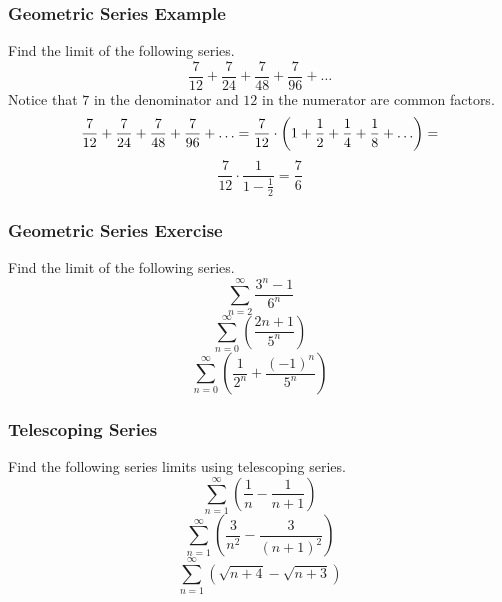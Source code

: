 \documentclass[xcolor=dvipsnames]{beamer}
\begin{document}
\begin{frame}
  \frametitle{Geometric Series Example}
 Find the limit of the following
series.
\begin{equation}
  \label{eq:aedairoy}
  \frac{7}{12}+\frac{7}{24}+\frac{7}{48}+\frac{7}{96}+{\ldots}
\end{equation}
Notice that $7$ in the denominator and $12$ in the numerator are
common factors.
\begin{equation}
  \label{eq:eechuwee}
  \frac{7}{12}+\frac{7}{24}+\frac{7}{48}+\frac{7}{96}+{\ldots}=\frac{7}{12}\cdot\left(1+\frac{1}{2}+\frac{1}{4}+\frac{1}{8}+{\ldots}\right)=\notag
\end{equation}
\begin{equation}
  \label{eq:pomahwus}
  \frac{7}{12}\cdot\frac{1}{1-\frac{1}{2}}=\frac{7}{6}
\end{equation}
\end{frame}

\begin{frame}
  \frametitle{Geometric Series Exercise}
  {\ubung} Find the limit of the
  following series.
\begin{equation}
  \label{eq:tahsaepi}
  \sum_{n=2}^{\infty}\frac{3^{n}-1}{6^{n}}
\end{equation}
\begin{equation}
  \label{eq:xahhusaj}
  \sum_{n=0}^{\infty}\left(\frac{2{n+1}}{5^{n}}\right)
\end{equation}
\begin{equation}
  \label{eq:vaetoegh}
  \sum_{n=0}^{\infty}\left(\frac{1}{2^{n}}+\frac{(-1)^{n}}{5^{n}}\right)
\end{equation}
\end{frame}

\begin{frame}
  \frametitle{Telescoping Series}
{\ubung} Find the following series limits using telescoping series.
\begin{equation}
  \label{eq:ekiesohj}
  \sum_{n=1}^{\infty}\left(\frac{1}{n}-\frac{1}{n+1}\right)
\end{equation}
\begin{equation}
  \label{eq:lohwoquo}
  \sum_{n=1}^{\infty}\left(\frac{3}{n^{2}}-\frac{3}{(n+1)^{2}}\right)
\end{equation}
\begin{equation}
  \label{eq:zaquadao}
  \sum_{n=1}^{\infty}\left(\sqrt{n+4}-\sqrt{n+3}\right)
\end{equation}
\end{frame}
\end{document}
